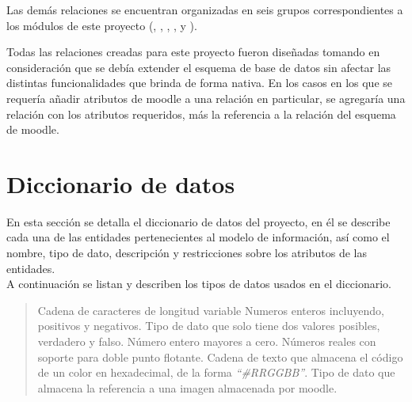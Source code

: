  \noindent Las demás relaciones se encuentran organizadas en seis grupos correspondientes
 a los módulos de este proyecto (, , ,
 ,  y ).

 \clearpage

 \noindent Todas las relaciones creadas para este proyecto fueron diseñadas tomando en
 consideración que se debía extender el esquema de base de datos sin afectar las distintas
 funcionalidades que brinda de forma nativa. En los casos en los que se requería añadir
 atributos de moodle a una relación en particular, se agregaría una relación con los atributos
 requeridos, más la referencia a la relación del esquema de moodle.


\clearpage
\section{Diccionario de datos}

 En esta sección se detalla el diccionario de datos del proyecto, en él se describe cada una
 de las entidades pertenecientes al modelo de información, así como el nombre, tipo de dato,
 descripción y restricciones sobre los atributos de las entidades.\\

 A continuación se listan y describen los tipos de
 datos usados en el diccionario.

    \begin{quote}
    \begin{bGlosario}
         Cadena de caracteres de longitud variable
                 Numeros enteros incluyendo, positivos y negativos.
         Tipo de dato que solo tiene dos valores posibles,
                                  verdadero y falso.
         Número entero mayores a cero.
           Números reales con soporte para doble punto flotante.
             Cadena de texto que almacena el código de un color en hexadecimal,
                                  de la forma {\it ``\#RRGGBB''}.
            Tipo de dato que almacena la referencia a una imagen almacenada por
                                  moodle.
    \end{bGlosario}
    \end{quote}

